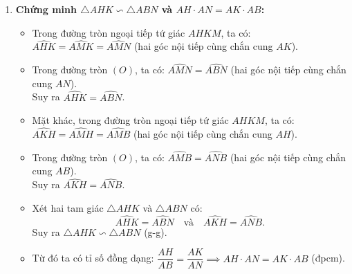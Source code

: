 \begin{ex}
{\begin{enumerate}[label=\textbf{\alph*)}]
    \item \textbf{Chứng minh $\triangle AHK \backsim \triangle ABN$ và $AH \cdot AN = AK \cdot AB$:}
    \begin{itemize}
        \item Trong đường tròn ngoại tiếp tứ giác $AHKM$, ta có:
        $\widehat{AHK} = \widehat{AMK} = \widehat{AMN}$ (hai góc nội tiếp cùng chắn cung $AK$).
        \item Trong đường tròn $(O)$, ta có:
        $\widehat{AMN} = \widehat{ABN}$ (hai góc nội tiếp cùng chắn cung $AN$).\\
        Suy ra $\widehat{AHK} = \widehat{ABN}$.
        \item Mặt khác, trong đường tròn ngoại tiếp tứ giác $AHKM$, ta có:
        $\widehat{AKH} = \widehat{AMH} = \widehat{AMB}$ (hai góc nội tiếp cùng chắn cung $AH$).
        \item Trong đường tròn $(O)$, ta có:
        $\widehat{AMB} = \widehat{ANB}$ (hai góc nội tiếp cùng chắn cung $AB$).\\
        Suy ra $\widehat{AKH} = \widehat{ANB}$.
        \item Xét hai tam giác $\triangle AHK$ và $\triangle ABN$ có:
        \[
        \widehat{AHK} = \widehat{ABN} \quad \text{và} \quad \widehat{AKH} = \widehat{ANB}.
        \]
        Suy ra $\triangle AHK \backsim \triangle ABN$ (g-g).
        \item Từ đó ta có tỉ số đồng dạng: $\dfrac{AH}{AB} = \dfrac{AK}{AN} \implies AH \cdot AN = AK \cdot AB$ (đpcm).
    \end{itemize}


\end{enumerate}}
\end{ex}
